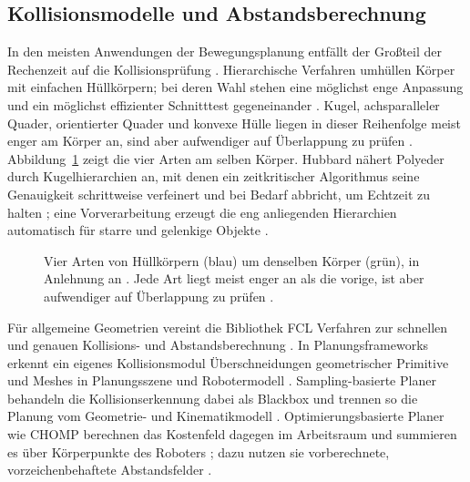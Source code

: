 \subsection{Kollisionsmodelle und Abstandsberechnung}
\label{sec:kollision_sdt}
In den meisten Anwendungen der Bewegungsplanung entfällt der Großteil der Rechenzeit auf die Kollisionsprüfung \cite{LaValle2006}.
Hierarchische Verfahren umhüllen Körper mit einfachen Hüllkörpern; bei deren Wahl stehen eine möglichst enge Anpassung und ein möglichst effizienter Schnitttest gegeneinander \cite{LaValle2006}.
Kugel, achsparalleler Quader, orientierter Quader und konvexe Hülle liegen in dieser Reihenfolge meist enger am Körper an, sind aber aufwendiger auf Überlappung zu prüfen \cite{LaValle2006}.
Abbildung~\ref{fig:huellkoerper} zeigt die vier Arten am selben Körper.
Hubbard nähert Polyeder durch Kugelhierarchien an, mit denen ein zeitkritischer Algorithmus seine Genauigkeit schrittweise verfeinert und bei Bedarf abbricht, um Echtzeit zu halten \cite{Hubbard1996}; eine Vorverarbeitung erzeugt die eng anliegenden Hierarchien automatisch für starre und gelenkige Objekte \cite{Hubbard1996}.

\begin{figure}[htbp]
  \centering
  
  \caption[Arten von Hüllkörpern]{Vier Arten von Hüllkörpern (blau) um denselben Körper (grün), in Anlehnung an \cite{LaValle2006}\ev{*}. Jede Art liegt meist enger an als die vorige, ist aber aufwendiger auf Überlappung zu prüfen \cite{LaValle2006}.}
  \label{fig:huellkoerper}
\end{figure}

Für allgemeine Geometrien vereint die Bibliothek FCL Verfahren zur schnellen und genauen Kollisions- und Abstandsberechnung \cite{Pan2012}.
In Planungsframeworks erkennt ein eigenes Kollisionsmodul Überschneidungen geometrischer Primitive und Meshes in Planungsszene und Robotermodell \cite{Coleman2014}.
Sampling-basierte Planer behandeln die Kollisionserkennung dabei als Blackbox und trennen so die Planung vom Geometrie- und Kinematikmodell \cite{LaValle2006}.
Optimierungsbasierte Planer wie CHOMP berechnen das Kostenfeld dagegen im Arbeitsraum und summieren es über Körperpunkte des Roboters \cite{Zucker2013}; dazu nutzen sie vorberechnete, vorzeichenbehaftete Abstandsfelder \cite{Schulman2014}.

